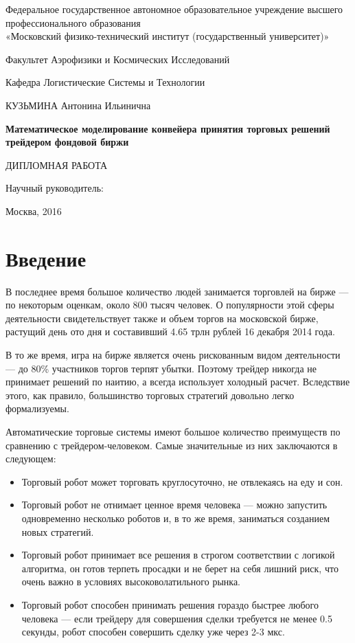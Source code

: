 \documentclass[a4paper, 14pt]{extarticle}
\numberwithin{figure}{subsection}
\numberwithin{equation}{subsection}
\begin{document}

\thispagestyle{empty}
\begin{center}
\small{Федеральное государственное автономное образовательное учреждение высшего профессионального образования \\ «Московский физико-технический институт (государственный университет)»

Факультет Аэрофизики и Космических Исследований

Кафедра Логистические Системы и Технологии}

\parskip=80pt
КУЗЬМИНА Антонина Ильинична
\parskip=30pt

\textbf{\large{Математическое моделирование конвейера принятия торговых решений трейдером фондовой биржи}}

ДИПЛОМНАЯ РАБОТА
\end{center}

\begin{flushright}
\parskip=50pt
Научный руководитель:
\end{flushright}

\vspace{\fill}
\begin{center}
Москва, 2016
\end{center}
\newpage{}
\tableofcontents{}
\newpage{}
\section*{Введение}
В последнее время большое количество людей занимается торговлей на бирже — по
некоторым оценкам, около 800 тысяч человек. О популярности этой сферы деятельности
свидетельствует также и объем торгов на московской бирже, растущий день ото дня и
составивший 4.65 трлн рублей 16 декабря 2014 года.

В то же время, игра на бирже является очень рискованным видом деятельности — до 80\%
участников торгов терпят убытки. Поэтому трейдер никогда не принимает решений по
наитию, а всегда использует холодный расчет. Вследствие этого, как правило, большинство
торговых стратегий довольно легко формализуемы.

Автоматические торговые системы имеют большое количество преимуществ по сравнению с
трейдером-человеком. Самые значительные из них заключаются в следующем:

\begin{itemize}
\item Торговый робот может торговать круглосуточно, не отвлекаясь на еду и сон.
\item Торговый робот не отнимает ценное время человека --- можно запустить
одновременно несколько роботов и, в то же время, заниматься созданием новых
стратегий.
\item Торговый робот принимает все решения в строгом соответствии с логикой алгоритма,
он готов терпеть просадки и не берет на себя лишний риск, что очень важно в
условиях высоковолатильного рынка.
\item Торговый робот способен принимать решения гораздо быстрее любого человека ---
если трейдеру для совершения сделки требуется не менее 0.5 секунды, робот способен
совершить сделку уже через 2-3 мкс.
\end{itemize}
\end{document}
